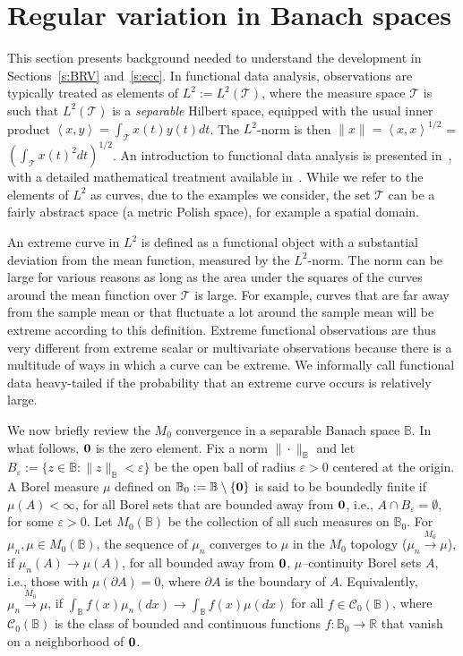 \documentclass[lineno]{biometrika}
\newcommand \eg{\varepsilon}
\newcommand\bzero{\mbox{\boldmath${0}$}}
\newcommand\mbB{{\mathbb B}}
\newcommand\mbR{{\mathbb R}}
\newcommand\cC{{\mathcal C}}
\newcommand\cT{{\mathcal T}}
\newcommand\lip{\left \langle}
\newcommand\rip{\right \rangle}
\begin{document}
\section{Regular variation in Banach spaces} \label{s:RV}
This section presents background needed to understand the development in Sections~\ref{s:BRV} and~\ref{s:ecc}. In functional data analysis, observations are typically treated as elements of $L^2 := L^2(\cT)$, where the measure space $\cT$ is such that $L^2(\cT)$ is a {\em separable} Hilbert
space, equipped with the usual inner product $\lip x,y\rip = \int_{\cT} x(t)y(t) dt$.  The $L^2$-norm is then $\| x\| = \lip x, x\rip^{1/2}$ = $ (\int_{\cT} x(t)^2 dt)^{1/2}$. An introduction to functional data analysis is presented in~\citet{KRbook}, with a detailed mathematical treatment available in~\citet{hsing:eubank:2015}. While we refer to the elements of
$L^2$ as curves, due to the  examples we consider, the set
$\cT$ can  be a fairly abstract space (a metric Polish space),
for example a spatial domain.

An extreme curve in $L^2$ is defined as a functional object with a substantial deviation from the mean function, measured by the $L^2$-norm. The norm can be large for various reasons as long as the area under the squares of the curves around the mean function over $\cT$ is large. For example, curves that are far away from the sample mean or that fluctuate a lot around the sample mean will be extreme according to this definition. Extreme functional observations are thus very different from extreme scalar or multivariate observations because there is a multitude of ways in which a curve can be extreme. We informally call functional data heavy-tailed if the probability that an  extreme curve occurs is relatively large.


We now briefly review the $M_0$ convergence in a separable Banach space $\mbB$. In what follows, $\bzero$ is the zero element. Fix a norm $\| \cdot \|_{\mbB}$ and let $B_{\eg} := \{z \in \mbB: \| z\|_{\mbB} <\eg\}$ be the open ball of radius $\eg>0$ centered at the origin. A Borel measure $\mu$ defined on $\mbB_0:=\mbB  \setminus \{\bzero\}$ is said to be boundedly finite if $\mu(A)<\infty$, for all Borel sets that are bounded away from $\bzero$, i.e., $A \cap B_{\eg} = \emptyset$, for some $\eg>0$. Let $M_0 (\mbB)$ be the collection of all such measures on $\mbB_0$. For $\mu_n, \mu \in M_0(\mbB)$, the sequence of $\mu_n$ converges to $\mu$ in the $M_0$ topology ($\mu_n \stackrel{M_0}{\longrightarrow} \mu$),
if $\mu_n(A) \to \mu(A)$, for all bounded away from $\bzero$, $\mu$--continuity Borel sets $A$, i.e., those with $\mu(\partial A)=0$, where $\partial A$ is the boundary of $A$. Equivalently, $\mu_n \stackrel{M_0}{\longrightarrow} \mu$, if $\int_{\mbB} f(x) \mu_n(dx) \to \int_{\mbB} f(x) \mu(dx)$ for all $f \in \cC_0(\mbB)$, where $\cC_0 (\mbB)$ is the class of bounded and continuous functions $f:\mbB_0 \to \mbR$ that vanish on a neighborhood of $\bzero$.
\end{document}
